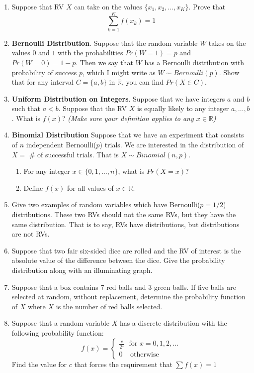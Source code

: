 \documentclass[]{book}
\providecommand{\tightlist}{%
  \setlength{\itemsep}{0pt}\setlength{\parskip}{0pt}}
\begin{document}
\begin{enumerate}
\def\labelenumi{\arabic{enumi}.}
\setcounter{enumi}{1}
\item
  Suppose that RV \(X\) can take on the values
  \(\{x_1,x_2,\dots,x_K\}\). Prove that \[\sum_{k=1}^K f(x_k) = 1\]
\item
  \textbf{Bernoulli Distribution}. Suppose that the random variable
  \(W\) takes on the values \(0\) and \(1\) with the probabilities
  \(Pr(W=1) = p\) and \(Pr(W=0) = 1-p\). Then we say that \(W\) has a
  Bernoulli distribution with probability of success \(p\), which I
  might write as \(W \sim Bernoulli(p)\). Show that for any interval
  \(C =\{a,b\}\) in \(\mathbb{R}\), you can find \(Pr(X \in C)\).
\item
  \textbf{Uniform Distribution on Integers}. Suppose that we have
  integers \(a\) and \(b\) such that \(a < b\). Suppose that the RV
  \(X\) is equally likely to any integer \(a,\dots,b\). What is
  \(f(x)\)? \emph{(Make sure your definition applies to any
  \(x\in\mathbb{R}\))}
\item
  \textbf{Binomial Distribution} Suppose that we have an experiment that
  consists of \(n\) independent Bernoulli(\(p\)) trials. We are
  interested in the distribution of \(X=\) \# of successful trials. That
  is \(X\sim Binomial(n,p)\).

  \begin{enumerate}
  \def\labelenumii{\alph{enumii})}
  \tightlist
  \item
    For any integer \(x \in \{0,1,\dots,n\}\), what is \(Pr(X=x)\)?
  \item
    Define \(f(x)\) for all values of \(x \in \mathbb{R}\).
  \end{enumerate}
\item
  Give two examples of random variables which have Bernoulli(\(p=1/2\))
  distributions. These two RVs should not the same RVs, but they have
  the same distribution. That is to say, RVs have distributions, but
  distributions are not RVs.
\item
  Suppose that two fair six-sided dice are rolled and the RV of interest
  is the absolute value of the difference between the dice. Give the
  probability distribution along with an illuminating graph.
\item
  Suppose that a box contains 7 red balls and 3 green balls. If five
  balls are selected at random, without replacement, determine the
  probability function of \(X\) where \(X\) is the number of red balls
  selected.
\item
  Suppose that a random variable \(X\) has a discrete distribution with
  the following probability function: \[f(x) = \begin{cases} 
    \frac{c}{2^x} \;\textrm{ for } x = 0, 1, 2, \dots \\
    0 \;\;\;\; \textrm{otherwise}
  \end{cases}\] Find the value for \(c\) that forces the requirement
  that \(\sum f(x) = 1\)
\end{enumerate}
\end{document}
